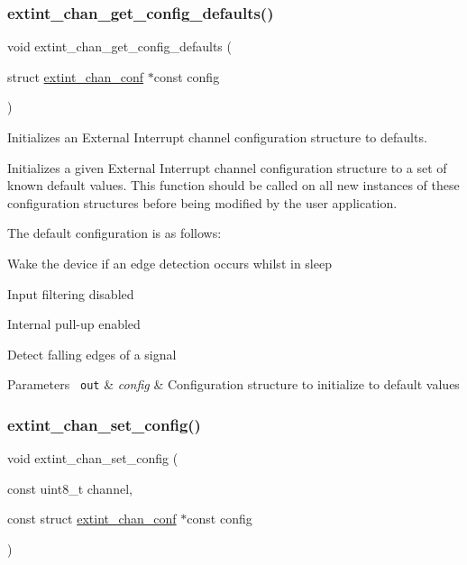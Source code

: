 \subsubsection{\texorpdfstring{extint\_chan\_get\_config\_defaults()}{extint\_chan\_get\_config\_defaults()}}
{\footnotesize\ttfamily void extint\+\_\+chan\+\_\+get\+\_\+config\+\_\+defaults (\begin{DoxyParamCaption}\item[{struct \mbox{\hyperlink{structextint__chan__conf}{extint\+\_\+chan\+\_\+conf}} $\ast$const}]{config }\end{DoxyParamCaption})}



Initializes an External Interrupt channel configuration structure to defaults. 

Initializes a given External Interrupt channel configuration structure to a set of known default values. This function should be called on all new instances of these configuration structures before being modified by the user application.

The default configuration is as follows\+: \begin{DoxyItemize}
\item Wake the device if an edge detection occurs whilst in sleep \item Input filtering disabled \item Internal pull-\/up enabled \item Detect falling edges of a signal\end{DoxyItemize}

\begin{DoxyParams}[1]{Parameters}
\mbox{\texttt{ out}}  & {\em config} & Configuration structure to initialize to default values \\
\hline
\end{DoxyParams}
\mbox{\label{group__asfdoc__sam0__extint__group_gace11f1168aa706f9b40f6c4d65b402a0}} 
\subsubsection{\texorpdfstring{extint\_chan\_set\_config()}{extint\_chan\_set\_config()}}
{\footnotesize\ttfamily void extint\+\_\+chan\+\_\+set\+\_\+config (\begin{DoxyParamCaption}\item[{const uint8\+\_\+t}]{channel,  }\item[{const struct \mbox{\hyperlink{structextint__chan__conf}{extint\+\_\+chan\+\_\+conf}} $\ast$const}]{config }\end{DoxyParamCaption})}




